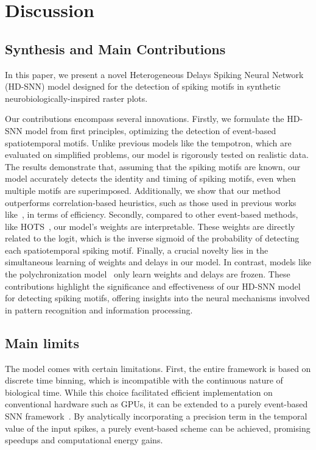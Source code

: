 \documentclass[runningheads]{llncs}
\begin{document}
\section{Discussion}
%
\subsection{Synthesis and Main Contributions}
In this paper, we present a novel Heterogeneous Delays Spiking Neural Network (HD-SNN) model designed for the detection of spiking motifs in synthetic neurobiologically-inspired raster plots.

Our contributions encompass several innovations. Firstly, we formulate the HD-SNN model from first principles, optimizing the detection of event-based spatiotemporal motifs. Unlike previous models like the tempotron, which are evaluated on simplified problems, our model is rigorously tested on realistic data. The results demonstrate that, assuming that the spiking motifs are known, our model accurately detects the identity and timing of spiking motifs, even when multiple motifs are superimposed. Additionally, we show that our method outperforms correlation-based heuristics, such as those used in previous works like~\cite{ghosh_spatiotemporal_2019,yu_stsc-snn_2022}, in terms of efficiency. Secondly, compared to other event-based methods, like HOTS~\cite{lagorce_hots_2017}, our model's weights are interpretable. These weights are directly related to the logit, which is the inverse sigmoid of the probability of detecting each spatiotemporal spiking motif. Finally, a crucial novelty lies in the simultaneous learning of weights and delays in our model. In contrast, models like the polychronization model~\cite{izhikevich_polychronization_2006} only learn weights and delays are frozen. These contributions highlight the significance and effectiveness of our HD-SNN model for detecting spiking motifs, offering insights into the neural mechanisms involved in pattern recognition and information processing.

\subsection{Main limits}

The model comes with certain limitations. First, the entire framework is based on discrete time binning, which is incompatible with the continuous nature of biological time. While this choice facilitated efficient implementation on conventional hardware such as GPUs, it can be extended to a purely event-based SNN framework~\cite{grimaldi_robust_2023}. By analytically incorporating a precision term in the temporal value of the input spikes, a purely event-based scheme can be achieved, promising speedups and computational energy gains.
\end{document}
